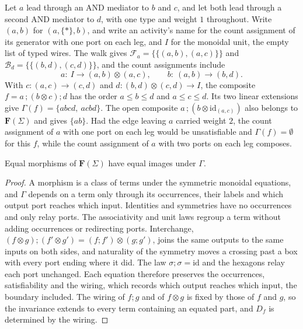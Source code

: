 \begin{exmp}
  \label{ex:and-fanout}
  Let $a$ lead through an AND mediator to $b$ and $c$, and let both lead through a second AND mediator to
  $d$, with one type and weight $1$ throughout. Write $(a,b)$ for $(a,\{\ast\},b)$, and write an
  activity's name for the count assignment of its generator with one port on each leg, and $I$ for the
  monoidal unit, the empty list of typed wires. The walk gives
  $\mathcal{F}_a=\{\{(a,b),(a,c)\}\}$ and $\mathcal{B}_d=\{\{(b,d),(c,d)\}\}$, and the count assignments include
  \[
    a:\ I\to(a,b)\otimes(a,c),\qquad b:\ (a,b)\to(b,d).
  \]
  With $c:(a,c)\to(c,d)$ and $d:(b,d)\otimes(c,d)\to I$, the composite
  $f=a\,;(b\otimes c);d$ has the order $a\le b\le d$ and $a\le c\le d$. Its two linear extensions
  give $\Gamma(f)=\{abcd,\ acbd\}$. The open composite $a\,;(b\otimes\mathrm{id}_{(a,c)})$ also
  belongs to $\mathbf{F}(\Sigma)$ and gives $\{ab\}$. Had the edge leaving $a$ carried weight $2$,
  the count assignment of $a$ with one port on each leg would be unsatisfiable and $\Gamma(f)=\emptyset$
  for this $f$, while the count assignment of $a$ with two ports on each leg composes.
\end{exmp}

\begin{lemma}
  \label{lem:gamma-well-defined}
  Equal morphisms of $\mathbf{F}(\Sigma)$ have equal images under $\Gamma$.
\end{lemma}
\begin{proof}
  A morphism is a class of terms under the symmetric monoidal equations, and $\Gamma$ depends on a
  term only through its occurrences, their labels and which output port reaches which input. Identities
  and symmetries have no occurrences and only relay ports. The associativity and unit laws regroup a
  term without adding occurrences or redirecting ports. Interchange, $(f\otimes g);(f'\otimes g')=
  (f;f')\otimes(g;g')$, joins the same outputs to the same inputs on both sides, and naturality
  of the symmetry moves a crossing past a box with every port ending where it did. The law
  $\sigma;\sigma=\mathrm{id}$ and the hexagons relay each port unchanged. Each equation therefore
  preserves the occurrences, satisfiability and the wiring, which records which output reaches
  which input, the boundary included. The wiring of $f;g$ and of $f\otimes g$ is fixed by
  those of $f$ and $g$, so the invariance extends to every term containing an equated part, and
  $D_f$ is determined by the wiring.
\end{proof}

